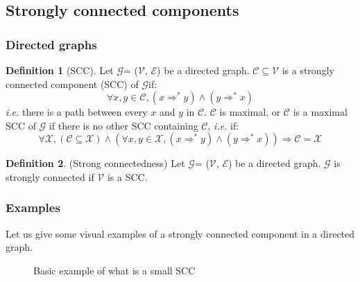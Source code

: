 \documentclass[a4 paper, 12pt]{article}
\theoremstyle{definition}
\def\GG{\ensuremath{\mathcal{G}}}
\def\VV{\ensuremath{\mathcal{V}}}
\def\EE{\ensuremath{\mathcal{E}}}
\newtheorem{definition}{Definition}
\begin{document}
\subsection{Strongly connected components}
\subsubsection{Directed graphs}\label{sec:directedgraphs}

\begin{definition}[SCC]
    Let \GG = (\VV, \EE) be a directed graph.
$\mathcal{C} \subseteq \mathcal{V}$ is a strongly connected component (SCC) of \GG if:
\begin{equation*}
    \forall x, y \in \mathcal{C}, (x \Rightarrow^* y) \wedge (y \Rightarrow^* x)
\end{equation*}
\textit{i.e.} there is a path between every $x$ and $y$ in $\mathcal{C}$.
\BlankLine
$\mathcal{C}$ is maximal, or $\mathcal{C}$ is a maximal SCC of \GG \xspace if there is no other SCC containing $\mathcal{C}$, \textit{i.e.} if:
\begin{equation*}
    \forall \mathcal{X}, (\mathcal{C} \subseteq \mathcal{X}) \wedge (\forall x, y \in \mathcal{X}, (x \Rightarrow^* y) \wedge (y \Rightarrow^* x)) \Longrightarrow \mathcal{C} = \mathcal{X}
\end{equation*}
\end{definition}

\begin{definition}(Strong connectedness)
Let \GG = (\VV, \EE) be a directed graph. \GG \xspace is strongly connected if \VV \xspace is a SCC.
\end{definition}

\subsubsection{Examples}
Let us give some visual examples of a strongly connected component in a directed graph.

\begin{figure}[!h]
    \centering
    \begin{subfigure}[t]{.49\textwidth}
        \label{fig:example1_a}
    \end{subfigure}
    \begin{subfigure}[t]{.49\textwidth}
        \label{fig:example1_b}
    \end{subfigure}
    \caption{Basic example of what is a small SCC}\label{fig:example1}
\end{figure}
\end{document}
